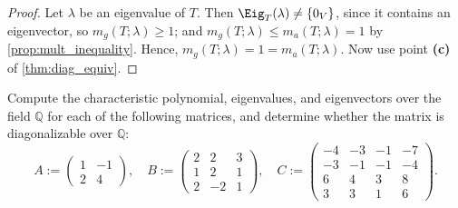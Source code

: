 \begin{proof}
  Let $\lambda$ be an eigenvalue of $T$. Then $\Eig_T(\lambda) \ne \{0_V\}$, since it contains an eigenvector, so $m_g(T;\lambda) \ge 1$; and $m_g(T;\lambda) \le m_a(T;\lambda) = 1$ by \cref{prop:mult_inequality}. Hence, $m_g(T;\lambda) = 1 = m_a(T;\lambda)$. Now use point \textbf{(c)} of \cref{thm:diag_equiv}.
\end{proof}

\begin{exercise}
  \label{exc:diagonalizability_over_Q}
  Compute the characteristic polynomial, eigenvalues, and eigenvectors over the field $\mathbb{Q}$ for each of the following matrices, and determine whether the matrix is diagonalizable over $\mathbb{Q}$:
  \[
  A := \begin{pmatrix} 1 & -1 \\ 2 & 4 \end{pmatrix}, \quad
  B := \begin{pmatrix} 2 & 2 & 3 \\ 1 & 2 & 1 \\ 2 & -2 & 1 \end{pmatrix}, \quad
  C := \begin{pmatrix}
    -4 & -3 & -1 & -7 \\
    -3 & -1 & -1 & -4 \\
    6 & 4 & 3 & 8 \\
    3 & 3 & 1 & 6
  \end{pmatrix}.
  \]
\end{exercise}

